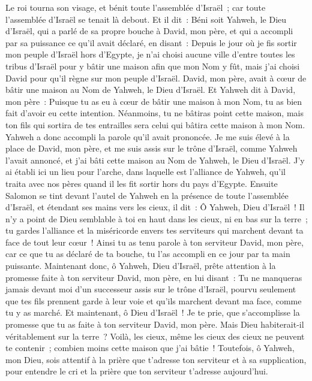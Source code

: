 \begin{multicols}{2}
Le roi tourna son visage, et bénit toute l'assemblée d'Israël~; car toute l'assemblée d'Israël se tenait là debout.
Et il dit~: Béni soit Yahweh, le Dieu d'Israël, qui a parlé de sa propre bouche à David, mon père, et qui a accompli par sa puissance ce qu'il avait déclaré, en disant~:
Depuis le jour où je fis sortir mon peuple d'Israël hors d'Egypte, je n'ai choisi aucune ville d'entre toutes les tribus d'Israël pour y bâtir une maison afin que mon Nom y fût, mais j'ai choisi David pour qu'il règne sur mon peuple d'Israël.
David, mon père, avait à cœur de bâtir une maison au Nom de Yahweh, le Dieu d'Israël.
Et Yahweh dit à David, mon père~: Puisque tu as eu à cœur de bâtir une maison à mon Nom, tu as bien fait d'avoir eu cette intention.
Néanmoins, tu ne bâtiras point cette maison, mais ton fils qui sortira de tes entrailles sera celui qui bâtira cette maison à mon Nom.
Yahweh a donc accompli la parole qu'il avait prononcée. Je me suis élevé à la place de David, mon père, et me suis assis sur le trône d'Israël, comme Yahweh l'avait annoncé, et j'ai bâti cette maison au Nom de Yahweh, le Dieu d'Israël.
J'y ai établi ici un lieu pour l'arche, dans laquelle est l'alliance de Yahweh, qu'il traita avec nos pères quand il les fit sortir hors du pays d'Egypte.
Ensuite Salomon se tint devant l'autel de Yahweh en la présence de toute l'assemblée d'Israël, et étendant ses mains vers les cieux,
il dit~: Ô Yahweh, Dieu d'Israël~! Il n'y a point de Dieu semblable à toi en haut dans les cieux, ni en bas sur la terre~; tu gardes l'alliance et la miséricorde envers tes serviteurs qui marchent devant ta face de tout leur cœur~!
Ainsi tu as tenu parole à ton serviteur David, mon père, car ce que tu as déclaré de ta bouche, tu l'as accompli en ce jour par ta main puissante.
Maintenant donc, ô Yahweh, Dieu d'Israël, prête attention à la promesse faite à ton serviteur David, mon père, en lui disant~: Tu ne manqueras jamais devant moi d'un successeur assis sur le trône d'Israël, pourvu seulement que tes fils prennent garde à leur voie et qu'ils marchent devant ma face, comme tu y as marché.
Et maintenant, ô Dieu d'Israël~! Je te prie, que s'accomplisse la promesse que tu as faite à ton serviteur David, mon père.
Mais Dieu habiterait-il véritablement sur la terre~? Voilà, les cieux, même les cieux des cieux ne peuvent te contenir~; combien moins cette maison que j'ai bâtie~!
Toutefois, ô Yahweh, mon Dieu, sois attentif à la prière que t'adresse ton serviteur et à sa supplication, pour entendre le cri et la prière que ton serviteur t'adresse aujourd'hui.

\end{multicols}
